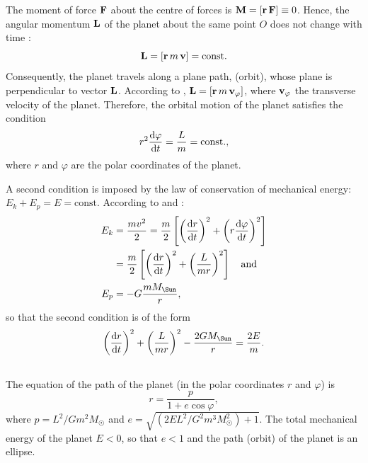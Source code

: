 The moment of force $\vb{F}$ about the centre of forces is $\vb{M} = \qty[\vb{r\,F}] \equiv 0$. Hence, the angular momentum $\vb{L}$ of the planet about the same point $O$ does not change with time :
\begin{equation*}%
\vb{L} = \qty[\vb{r} \, m \, \vb{v}] = \textrm{const.}
\end{equation*}
Consequently, the planet travels along a plane path, (orbit), whose plane is perpendicular to vector $\vb{L}$. According to , $\vb{L} = \qty[\vb{r} \, m \, \vb{v}_{\varphi}]$, where $\vb{v}_{\varphi}$ the transverse velocity of the planet. Therefore, the orbital motion of the planet satisfies the con­dition
\begin{equation*}%
r^{2} \dv{\varphi}{t} = \frac{L}{m} = \textrm{const.},
\end{equation*}
where $r$ and $\varphi$ are the polar coordinates of the planet.

A second condition is imposed by the law of conservation of mechanical energy: $E_{k} + E_{p} = E = \textrm{const}$. According to
 and :
\begin{align*}%
E_{k} & = \frac{mv^{2}}{2} = \frac{m}{2} \left[\left( \dv{r}{t}\right)^{2} + \left( r \dv{\varphi}{t}\right)^{2} \right]\\
& = \frac{m}{2}\left[\left( \dv{r}{t}\right)^{2}+ \left( \frac{L}{mr}\right)^{2} \right] \qand \\
E_{p} & = - G \frac{mM_{\Sun}}{r},
\end{align*}
so that the second condition is of the form
\begin{equation*}%
\left( \dv{r}{t}\right)^{2}+ \left( \frac{L}{mr}\right)^{2} - \frac{2GM_{\Sun}}{r} = \frac{2E}{m}.
\end{equation*}

\subsection{}\label{6.3.2} The equation of the path of the planet (in the polar coor­dinates $r$ and $\varphi$) is
\begin{equation*}%
r = \frac{p}{1 + e \cos \varphi},
\end{equation*}
where $p = L^{2}/Gm^{2}M_{\Sun}$ and $e = \sqrt{(2EL^{2}/G^{2}m^{3}M_{\Sun}^{2}) + 1}$. The total mechanical energy of the planet $E < 0$, so that $e < 1$ and the path (orbit) of the planet is an ellipse.

